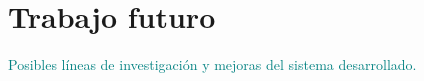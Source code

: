 \section{Trabajo futuro}
\textcolor{teal}{Posibles líneas de investigación y mejoras del sistema desarrollado.}
